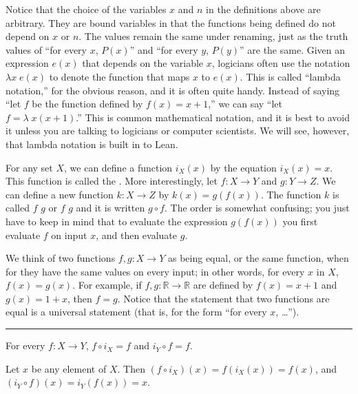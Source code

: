 \documentclass[letterpaper,10pt,english]{sphinxmanual}
\begin{document}
\sphinxAtStartPar
Notice that the choice of the variables \(x\) and \(n\) in the definitions above are arbitrary. They are bound variables in that the functions being defined do not depend on \(x\) or \(n\). The values remain the same under renaming, just as the truth values of “for every \(x\), \(P(x)\)” and “for every \(y\), \(P(y)\)” are the same. Given an expression \(e(x)\) that depends on the variable \(x\), logicians often use the notation \(\lambda x \; e(x)\) to denote the function that maps \(x\) to \(e(x)\). This is called “lambda notation,” for the obvious reason, and it is often quite handy. Instead of saying “let \(f\) be the function defined by \(f(x) = x+1\),” we can say “let \(f = \lambda \; x (x + 1)\).” This is  common mathematical notation, and it is best to avoid it unless you are talking to logicians or computer scientists. We will see, however, that lambda notation is built in to Lean.

\sphinxAtStartPar
For any set \(X\), we can define a function \(i_X(x)\) by the equation \(i_X(x) = x\). This function is called the . More interestingly, let \(f : X \to Y\) and \(g : Y \to Z\). We can define a new function \(k : X \to Z\) by \(k(x) = g(f(x))\). The function \(k\) is called  \(f\)  \(g\) or \(f\)  \(g\) and it is written \(g \circ f\). The order is somewhat confusing; you just have to keep in mind that to evaluate the expression \(g(f(x))\) you first evaluate \(f\) on input \(x\), and then evaluate \(g\).

\sphinxAtStartPar
We think of two functions \(f, g : X \to Y\) as being equal, or the same function, when for they have the same values on every input; in other words, for every \(x\) in \(X\), \(f(x) = g(x)\). For example, if \(f, g : \mathbb{R} \to \mathbb{R}\) are defined by \(f(x) = x + 1\) and \(g(x) = 1 + x\), then \(f = g\). Notice that the statement that two functions are equal is a universal statement (that is, for the form “for every \(x\), …”).


\bigskip\hrule\bigskip


\sphinxAtStartPar
{} For every \(f : X \to Y\), \(f \circ i_X = f\) and \(i_Y \circ f = f\).

\sphinxAtStartPar
{} Let \(x\) be any element of \(X\). Then \((f \circ i_X)(x) = f(i_X(x)) = f(x)\), and \((i_Y \circ f)(x) = i_Y(f(x)) = x\).
\end{document}
